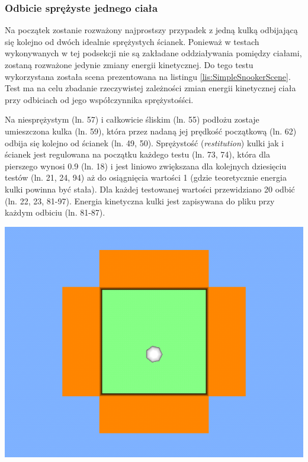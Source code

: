 \subsubsection{Odbicie sprężyste jednego ciała}\label{sec:odbicie1ciala}
Na początek zostanie rozważony najprostszy przypadek z jedną kulką
odbijającą się kolejno od dwóch idealnie sprężystych ścianek. Ponieważ w
testach wykonywanych w tej podsekcji nie są zakładane oddziaływania pomiędzy
ciałami, zostaną rozważone jedynie zmiany energii kinetycznej. Do tego testu
wykorzystana została scena prezentowana na listingu
\ref{lis:SimpleSnookerScene}. Test ma na celu zbadanie rzeczywistej zależności
zmian energii kinetycznej ciała przy odbiciach od jego współczynnika
sprężystośści.


Na niesprężystym (ln. 57) i całkowicie śliskim (ln. 55) podłożu zostaje
umieszczona kulka (ln. 59), która przez nadaną jej prędkość początkową (ln. 62)
odbija się kolejno od ścianek (ln. 49, 50). Sprężystość (\emph{restitution})
kulki jak i ścianek jest regulowana na początku każdego testu (ln. 73, 74),
która dla pierszego wynosi 0.9 (ln. 18) i jest liniowo zwiększana dla kolejnych
dziesięciu testów (ln. 21, 24, 94) aż do osiągnięcia wartości 1 (gdzie
teoretycznie energia kulki powinna być stała).
Dla każdej testowanej wartości przewidziano 20 odbić (ln. 22, 23, 81-97).
Energia kinetyczna kulki jest zapisywana do pliku przy każdym odbiciu (ln.
81-87).

\begin{center}
\includegraphics[scale = 0.5]{./img/SimpleSnookerScene.png}
\end{center}

